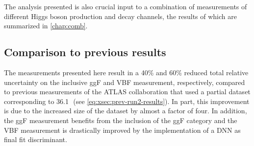 The analysis presented is also crucial input to a combination of measurements of different Higgs boson production and decay channels, the results of which are summarized in \cref{chap:comb}.


\subsection{Comparison to previous results}
The measurements presented here result in a 40\% and 60\% reduced total relative uncertainty on the inclusive ggF and VBF measurement, respectively, compared to previous \RunTwo measurements of the ATLAS collaboration that used a partial \RunTwo dataset corresponding to 36.1\,\ifb\ (see \cref{eq:xsec:prev-run2-results}). 
In part, this improvement is due to the increased size of the dataset by almost a factor of four.
In addition, the ggF measurement benefits from the inclusion of the ggF \TwoJet category and the VBF measurement is drastically improved by the implementation of a DNN as final fit discriminant. 

